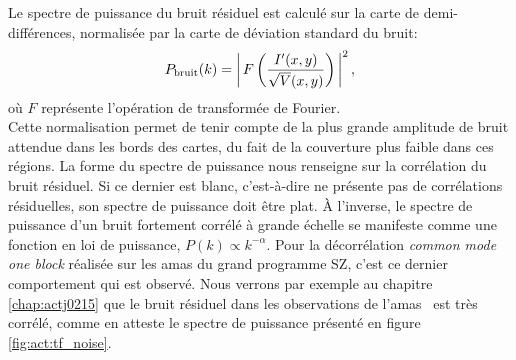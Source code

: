 Le spectre de puissance du bruit résiduel est calculé sur la carte de demi-différences, normalisée par la carte de déviation standard du bruit:
\begin{equation}
    \label{eq:noise_power_spectrum}
    P_{\rm bruit}(k) = \left| \, F \left( \frac{I'(x, y)}{\sqrt{V}(x, y)} \right) \, \right|^2,
\end{equation}
où $F$ représente l'opération de transformée de Fourier. \\
Cette normalisation permet de tenir compte de la plus grande amplitude de bruit attendue dans les bords des cartes, du fait de la couverture plus faible dans ces régions.
La forme du spectre de puissance nous renseigne sur la corrélation du bruit résiduel.
Si ce dernier est blanc, c'est-à-dire ne présente pas de corrélations résiduelles, son spectre de puissance doit être plat.
À l'inverse, le spectre de puissance d'un bruit fortement corrélé à grande échelle se manifeste comme une fonction en loi de puissance, $P(k) \propto k^{-\alpha}$.
Pour la décorrélation \textit{common mode one block} réalisée sur les amas du grand programme SZ, c'est ce dernier comportement qui est observé.
Nous verrons par exemple au chapitre \ref{chap:actj0215} que le bruit résiduel dans les observations de l'amas \act\ est très corrélé, comme en atteste le spectre de puissance présenté en figure \ref{fig:act:tf_noise}.

